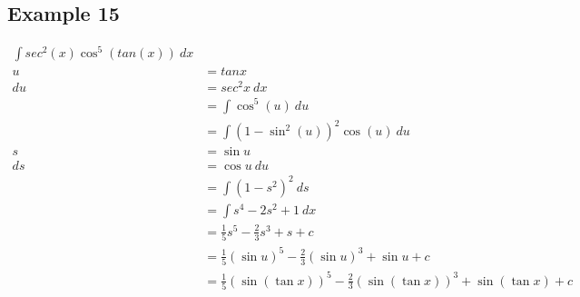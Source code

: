 \documentclass{article}
\theoremstyle{mytheoremstyle}
\theoremstyle{mytheoremstyle}
\theoremstyle{myproblemstyle}
\begin{document}
    \subsection*{Example 15}
    \begin{align*}
        \int sec^2(x) \cos^5(tan(x)) \ dx \\
        u &= tan x \\
        du &= sec^2 x\ dx \\
        &=\int \cos^5(u) \ du \\
        &=\int (1-\sin^2(u))^2 \cos(u) \ du \\
        s &= \sin u \\
        ds &= \cos u\ du \\
        &=\int (1-s^2)^2 \ ds \\
        &=\int s^4 -2s^2 + 1 \ dx \\
        &= \frac{1}{5} s^5 - \frac{2}{3} s^3 + s + c \\
        &= \frac{1}{5} (\sin u)^5 - \frac{2}{3} (\sin u)^3 + \sin u + c \\
        &= \frac{1}{5} (\sin (\tan x))^5 - \frac{2}{3} (\sin (\tan x))^3 + \sin (\tan x) + c
    \end{align*}
\end{document}

